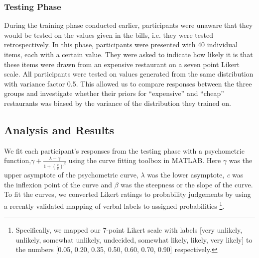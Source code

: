\documentclass[10pt,letterpaper]{article}
\begin{document}
\subsubsection{Testing Phase}
During the training phase conducted earlier, participants were unaware that they would be tested on the values given in the bills, i.e. they were tested retrospectively. In this phase, participants were presented with 40 individual items, each with a certain value. They were asked to indicate how likely it is that these items were drawn from an expensive restaurant on a seven point Likert scale. All participants were tested on values generated from the same distribution with variance factor 0.5. This allowed us to compare responses between the three groups and investigate whether their priors for “expensive” and “cheap” restaurants was biased by the variance of the distribution they trained on. 

\subsection{Analysis and Results}

We fit each participant's responses from the testing phase with  a psychometric function,$\gamma +\frac{\lambda - \gamma }{1 + (\frac{x}{c})^{\beta}}$ using the curve fitting toolbox in MATLAB. Here $\gamma$ was the upper asymptote of the psychometric curve, $\lambda$ was the lower asymptote, \textit{c} was the inflexion point of the curve and $\beta$ was the steepness or the slope of the curve. To fit the curves, we converted Likert ratings to probability judgements by using a recently validated mapping of verbal labels to assigned probabilities \cite{hancock2020quantifying}\footnote{Specifically, we mapped our 7-point Likert scale with labels [very unlikely, unlikely, somewhat unlikely, undecided, somewhat likely, likely, very likely] to the numbers [0.05, 0.20, 0.35, 0.50, 0.60, 0.70, 0.90] respectively.}.


\end{document}

